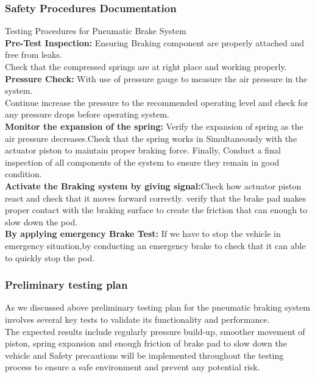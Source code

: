 \subsubsection{Safety Procedures Documentation}
Testing Procedures for Pneumatic Brake System\\

\noindent
\textbf{Pre-Test Inspection:}
Ensuring Braking component are properly attached and free from leaks.\\
Check that the compressed springs are at right place and working properly.\\

\noindent
\textbf{Pressure Check:} With use of pressure gauge to measure the air pressure in the system.\\
Continue increase the pressure to the recommended operating level and check for any pressure drops before operating system.\\

\noindent
\textbf{Monitor the expansion of the spring:}
Verify the expansion of spring as the air pressure decreases.Check that the spring works in Simultaneously with the actuator piston to maintain proper braking force.
Finally, Conduct a final inspection of all components of the system to ensure they remain in good condition.\\

\noindent
\textbf{Activate the Braking system by giving signal:}Check how actuator piston react and check that it moves forward correctly.
verify that the brake pad makes proper contact with the braking surface to create the friction that can enough to slow down the pod.\\

\noindent
\textbf{By applying emergency Brake Test:}
If we have to stop the vehicle in emergency situation,by conducting an emergency brake to check that it can able to quickly stop the pod. 

\subsubsection{Preliminary testing plan}
As we discussed above preliminary testing plan for the pneumatic braking system involves several key tests to validate its functionality and performance.\\
The expected results include regularly pressure build-up, smoother movement of piston, spring expansion and enough friction of brake pad to slow down the vehicle and  Safety precautions will be implemented throughout the testing process to ensure a safe environment and prevent any potential risk.

